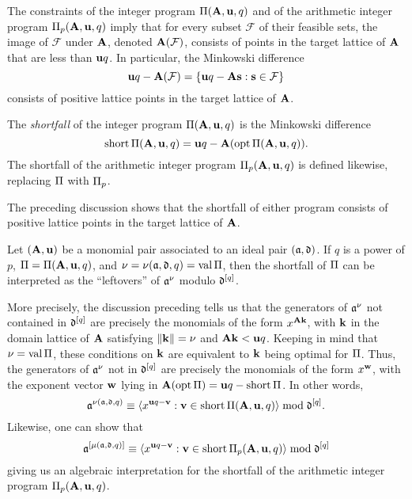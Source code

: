 \documentclass{article}
\begin{document}
The constraints of the integer program $\Pi(\mathbf{A},\mathbf{u},q)$ and of the arithmetic integer program $\Pi_p(\mathbf{A},\mathbf{u},q)$ imply that for every subset $\mathcal{F}$ of their feasible sets, the image of $\mathcal{F}$ under $\mathbf{A}$, denoted $\mathbf{A}(\mathcal{F})$, consists of points in the target lattice of $\mathbf{A}$ that are less than $\mathbf{u}q$.
In particular, the Minkowski difference
\[\mathbf{u}q-\mathbf{A}(\mathcal{F}) = \{\mathbf{u}q - \mathbf{A} \mathbf{s}: \mathbf{s}\in \mathcal{F}\}\]
consists of positive lattice points in the target lattice of $\mathbf{A}$.

\begin{definition}
   The \emph{shortfall} of the integer program $\Pi(\mathbf{A}, \mathbf{u}, q)$ is the Minkowski difference
   \[ \operatorname{short} \Pi(\mathbf{A}, \mathbf{u}, q) = \mathbf{u}q - \mathbf{A}( \operatorname{opt} \Pi(\mathbf{A}, \mathbf{u}, q)).\]
   The shortfall of the arithmetic integer program $\Pi_p(\mathbf{A}, \mathbf{u}, q)$ is defined likewise, replacing $\Pi$ with $\Pi_p$.
\end{definition}

The preceding discussion shows that the shortfall of either program consists of positive lattice points in the target lattice of $\mathbf{A}$.

\begin{remark}
\label{shortfall motivation: R}
Let $(\mathbf{A},\mathbf{u})$ be a monomial pair associated to an ideal pair $(\mathfrak{a},\mathfrak{d})$.
If $q$ is a power of $p$, $\Pi = \Pi(\mathbf{A},\mathbf{u},q)$, and $\nu = \nu(\mathfrak{a},\mathfrak{d},q) = \operatorname{val} \Pi$, then the shortfall of $\Pi$ can be interpreted as the ``leftovers'' of $\mathfrak{a}^\nu$ modulo $\mathfrak{d}^{[q]}$.

More precisely, the discussion preceding  tells us that the generators of $\mathfrak{a}^{\nu}$ not contained in $\mathfrak{d}^{[q]}$ are precisely the monomials of the form $x^{\mathbf{A} \mathbf{k}}$, with $\mathbf{k}$ in the domain lattice of $\mathbf{A}$ satisfying $\| \mathbf{k} \| = \nu$ and $\mathbf{A}\mathbf{k}<\mathbf{u}q$.
Keeping in mind that $\nu= \operatorname{val} \Pi$, these conditions on $\mathbf{k}$ are equivalent to $\mathbf{k}$ being optimal for $\Pi$.
Thus, the generators of $\mathfrak{a}^{\nu}$ not in $\mathfrak{d}^{[q]}$ are precisely the monomials of the form $x^{\mathbf{w}}$, with the exponent vector $\mathbf{w}$ lying in $\mathbf{A}(\operatorname{opt} \Pi) = \mathbf{u}q - \operatorname{short} \Pi$.
In other words,
\begin{equation}
\label{algebraic shortfall PI general: e}
 \mathfrak{a}^{\nu(\mathfrak{a}, \mathfrak{d}, q)} \equiv \langle x^{\mathbf{u}q-\mathbf{v}}: \mathbf{v} \in \operatorname{short} \Pi(\mathbf{A},\mathbf{u},q) \rangle \bmod \mathfrak{d}^{[q]}.
 \end{equation}
Likewise, one can show that
\begin{equation}
\label{algebraic shortfall PI_p general: e}
\mathfrak{a}^{[\mu(\mathfrak{a}, \mathfrak{d}, q)]} \equiv \langle x^{\mathbf{u}q-\mathbf{v}}: \mathbf{v} \in \operatorname{short} \Pi_p(\mathbf{A},\mathbf{u},q) \rangle \bmod \mathfrak{d}^{[q]}
\end{equation}
giving us an algebraic interpretation for the shortfall of the arithmetic integer program $\Pi_p(\mathbf{A},\mathbf{u},q)$.
\end{remark}
\end{document}

